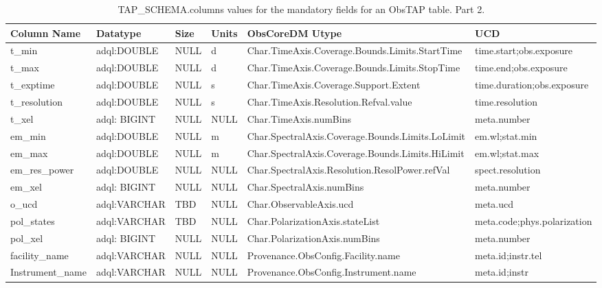 \documentclass[11pt,a4paper]{ivoa}
\begin{document}
\begin{table}
\small
\begin{tabular}{|l|l|l|l|l|l|}%
\hline
Column Name & Datatype & Size & Units & ObsCoreDM Utype & UCD \\\hline
t\_min &
adql:DOUBLE &
NULL &
d &
Char.TimeAxis.Coverage.Bounds.Limits.StartTime &
time.start;obs.exposure \\\hline
t\_max &
adql:DOUBLE &
NULL &
d &
Char.TimeAxis.Coverage.Bounds.Limits.StopTime &
time.end;obs.exposure
\\\hline
t\_exptime &
adql:DOUBLE &
NULL &
s &
Char.TimeAxis.Coverage.Support.Extent &
time.duration;obs.exposure
\\\hline
t\_resolution &
adql:DOUBLE &
NULL &
s &
Char.TimeAxis.Resolution.Refval.value &
time.resolution
\\\hline
t\_xel &
adql: BIGINT &
NULL &
NULL &
Char.TimeAxis.numBins &
meta.number
\\\hline
em\_min &
adql:DOUBLE &
NULL &
m &
Char.SpectralAxis.Coverage.Bounds.Limits.LoLimit &
em.wl;stat.min
\\\hline
em\_max &
adql:DOUBLE &
NULL &
m &
Char.SpectralAxis.Coverage.Bounds.Limits.HiLimit &
em.wl;stat.max
\\\hline
em\_res\_power &
adql:DOUBLE &
NULL &
NULL &
Char.SpectralAxis.Resolution.ResolPower.refVal &
spect.resolution
\\\hline
em\_xel &
adql: BIGINT &
NULL &
NULL &
Char.SpectralAxis.numBins &
meta.number
\\\hline
o\_ucd &
adql:VARCHAR &
TBD &
NULL &
Char.ObservableAxis.ucd &
meta.ucd
\\\hline
pol\_states &
adql:VARCHAR &
TBD &
NULL &
Char.PolarizationAxis.stateList &
meta.code;phys.polarization
\\\hline
pol\_xel &
adql: BIGINT &
NULL &
NULL &
Char.PolarizationAxis.numBins &
meta.number
\\\hline
facility\_name &
adql:VARCHAR &
NULL &
NULL &
Provenance.ObsConfig.Facility.name &
meta.id;instr.tel
\\\hline
Instrument\_name &
adql:VARCHAR &
NULL  &
NULL &
Provenance.ObsConfig.Instrument.name &
meta.id;instr
\\\hline
\end{tabular}
\caption{TAP\_SCHEMA.columns values for the mandatory fields for an ObsTAP table.  Part 2.}
\label{table:tapschema-mandatory2}
\end{table}
\end{document}
